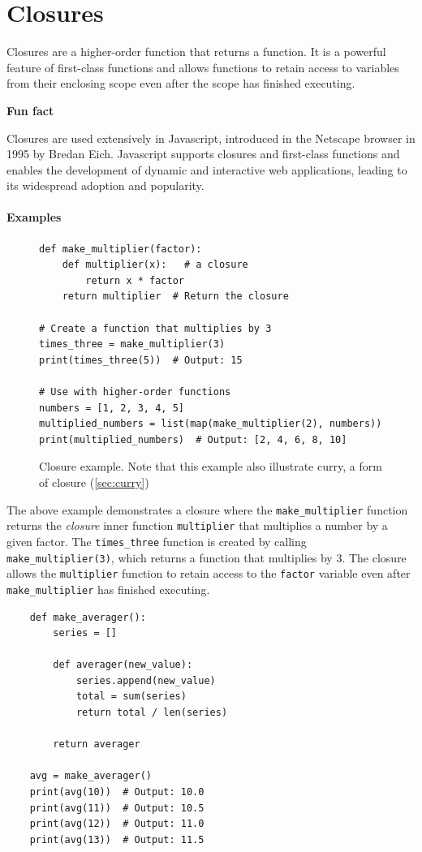 \documentclass[oneside,11pt,dvipsnames]{book}
\newenvironment{historybox}[1][]{
  \small
  \begin{myhistorybox}
    {\small \textbf{#1}}
  }{
  \end{myhistorybox}
}
\newcommand{\code}[1]{\texttt{#1}}
\begin{document}
\section{Closures}
Closures are a higher-order function that returns a function. It is a powerful feature of first-class functions and allows functions to retain access to variables from their enclosing scope even after the scope has finished executing.

\begin{historybox}[Fun fact] 
    Closures are used extensively in Javascript, introduced in the Netscape browser in 1995 by Bredan Eich. Javascript supports closures and first-class functions and enables the development of dynamic and interactive web applications, leading to its widespread adoption and popularity.
\end{historybox}
\paragraph{Examples}
\begin{figure}
\begin{lstlisting}
def make_multiplier(factor):
    def multiplier(x):   # a closure
        return x * factor
    return multiplier  # Return the closure

# Create a function that multiplies by 3
times_three = make_multiplier(3)
print(times_three(5))  # Output: 15

# Use with higher-order functions
numbers = [1, 2, 3, 4, 5]
multiplied_numbers = list(map(make_multiplier(2), numbers))
print(multiplied_numbers)  # Output: [2, 4, 6, 8, 10]
\end{lstlisting}
\caption{Closure example. Note that this example also illustrate curry, a form of closure (\autoref{sec:curry})}\label{ex:closure-example}
\end{figure}

The above example demonstrates a closure where the \code{make\_multiplier} function returns the \emph{closure} inner function \code{multiplier} that multiplies a number by a given factor. The \code{times\_three} function is created by calling \code{make\_multiplier(3)}, which returns a function that multiplies by 3. The closure allows the \code{multiplier} function to retain access to the \code{factor} variable even after \code{make\_multiplier} has finished executing.

\begin{lstlisting}
    def make_averager():
        series = []

        def averager(new_value):
            series.append(new_value)
            total = sum(series)
            return total / len(series)

        return averager

    avg = make_averager()
    print(avg(10))  # Output: 10.0
    print(avg(11))  # Output: 10.5
    print(avg(12))  # Output: 11.0
    print(avg(13))  # Output: 11.5
\end{lstlisting}
\end{document}

